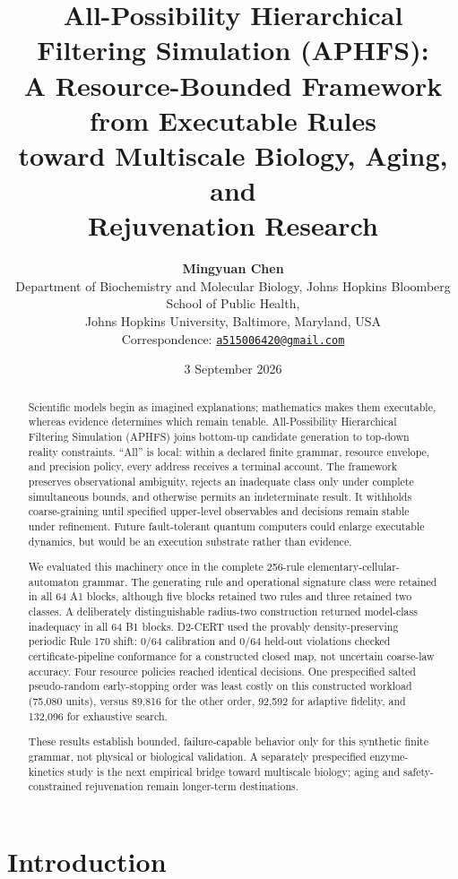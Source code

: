 \documentclass[10pt]{article}
\title{\color{aphfsnavy}\textbf{All-Possibility Hierarchical Filtering Simulation (APHFS):\\
A Resource-Bounded Framework from Executable Rules\\
toward Multiscale Biology, Aging, and\\
Rejuvenation Research}}
\author{\textbf{Mingyuan Chen}\\
\small Department of Biochemistry and Molecular Biology, Johns Hopkins Bloomberg School of Public Health,\\
\small Johns Hopkins University, Baltimore, Maryland, USA\\
\small Correspondence: \href{mailto:a515006420@gmail.com}{\texttt{a515006420@gmail.com}}}
\date{3 September 2026}
\theoremstyle{definition}
\begin{document}
\pagestyle{aphfs}
\maketitle
\thispagestyle{plain}

\begin{abstract}
Scientific models begin as imagined explanations; mathematics makes them executable, whereas
evidence determines which remain tenable. All-Possibility Hierarchical Filtering Simulation
(APHFS) joins bottom-up candidate generation to top-down reality constraints. ``All'' is local:
within a declared finite grammar, resource envelope, and precision policy, every address receives
a terminal account. The framework preserves observational ambiguity, rejects an inadequate class
only under complete simultaneous bounds, and otherwise permits an indeterminate result. It
withholds coarse-graining until specified upper-level observables and decisions remain stable
under refinement. Future fault-tolerant quantum computers could enlarge executable dynamics, but
would be an execution substrate rather than evidence.

We evaluated this machinery once in the complete 256-rule elementary-cellular-automaton grammar.
The generating rule and operational signature class were retained in all 64 A1 blocks, although
five blocks retained two rules and three retained two classes. A deliberately distinguishable
radius-two construction returned model-class inadequacy in all 64 B1 blocks. D2-CERT used the
provably density-preserving periodic Rule 170 shift: 0/64 calibration and 0/64 held-out violations
checked certificate-pipeline conformance for a constructed closed map, not uncertain coarse-law
accuracy. Four resource policies reached identical decisions. One prespecified salted
pseudo-random early-stopping order was least costly on this constructed workload (75,080 units),
versus 89,816 for the other order, 92,592 for adaptive fidelity, and 132,096 for exhaustive search.

These results establish bounded, failure-capable behavior only for this synthetic finite grammar,
not physical or biological validation. A separately prespecified enzyme-kinetics study is the
next empirical bridge toward multiscale biology; aging and safety-constrained rejuvenation remain
longer-term destinations.
\end{abstract}

\section{Introduction}
\end{document}
